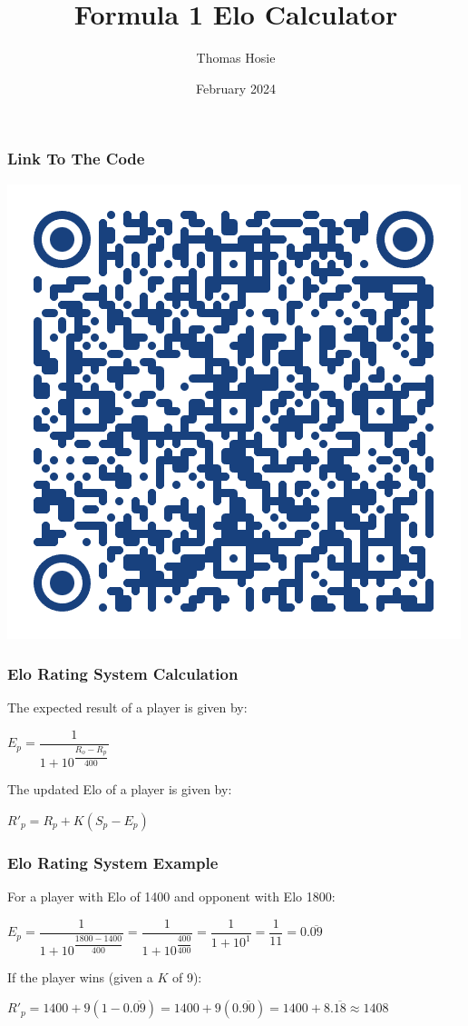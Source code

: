 \documentclass{beamer}
\title{Formula 1 Elo Calculator}
\author{Thomas Hosie}
\date{February 2024}
\begin{document}
\begin{frame}
    \titlepage
\end{frame}

\begin{frame}
    
    \frametitle{Link To The Code}
    \center\includegraphics[width=\textheight]{Qr Code.png}
\end{frame}

\begin{frame}
    \frametitle{Elo Rating System Calculation}
    The expected result of a player is given by:
    \begin{center}
        $E_p = \dfrac{1}{1+10^ \dfrac{R_o-R_p}{400}}$
    \end{center}
    The updated Elo of a player is given by:
    \begin{center}
        $R'_p = R_p + K(S_p-E_p)$
    \end{center}
\end{frame}

\begin{frame}
    \frametitle{Elo Rating System Example}
    For a player with Elo of 1400 and opponent with Elo 1800:
    \begin{center}
        $E_p = \dfrac{1}{1+10^ \dfrac{1800-1400}{400}} = \dfrac{1}{1+10^ \dfrac{400}{400}}= \dfrac{1}{1+10^1}= \dfrac{1}{11}= 0.\overline{09}$
    \end{center}
    If the player wins (given a $K$ of 9):
    \begin{center}
        $R'_p = 1400 + 9(1-0.\overline{09})= 1400 + 9(0.\overline{90})= 1400 + 8.\overline{18} \approx 1408$
    \end{center}
\end{frame}
\end{document}
